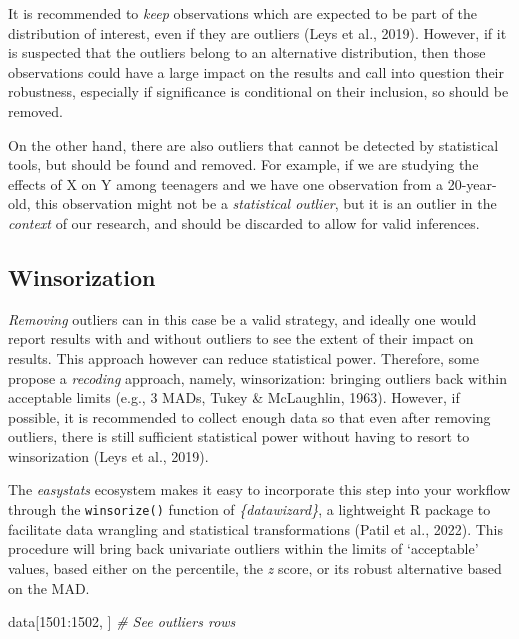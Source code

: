 \documentclass{article}
\newenvironment{Shaded}{\begin{snugshade}}{\end{snugshade}}
\newcommand{\CommentTok}[1]{\textcolor[rgb]{0.56,0.35,0.01}{\textit{#1}}}
\newcommand{\DecValTok}[1]{\textcolor[rgb]{0.00,0.00,0.81}{#1}}
\newcommand{\NormalTok}[1]{#1}
\newcommand{\SpecialCharTok}[1]{\textcolor[rgb]{0.00,0.00,0.00}{#1}}
\begin{document}
It is recommended to \emph{keep} observations which are expected to be
part of the distribution of interest, even if they are outliers (Leys et
al., 2019). However, if it is suspected that the outliers belong to an
alternative distribution, then those observations could have a large
impact on the results and call into question their robustness,
especially if significance is conditional on their inclusion, so should
be removed.

On the other hand, there are also outliers that cannot be detected by
statistical tools, but should be found and removed. For example, if we
are studying the effects of X on Y among teenagers and we have one
observation from a 20-year-old, this observation might not be a
\emph{statistical outlier}, but it is an outlier in the \emph{context}
of our research, and should be discarded to allow for valid inferences.

\hypertarget{winsorization}{%
\subsection{Winsorization}\label{winsorization}}

\emph{Removing} outliers can in this case be a valid strategy, and
ideally one would report results with and without outliers to see the
extent of their impact on results. This approach however can reduce
statistical power. Therefore, some propose a \emph{recoding} approach,
namely, winsorization: bringing outliers back within acceptable limits
(e.g., 3 MADs, Tukey \& McLaughlin, 1963). However, if possible, it is
recommended to collect enough data so that even after removing outliers,
there is still sufficient statistical power without having to resort to
winsorization (Leys et al., 2019).

The \emph{easystats} ecosystem makes it easy to incorporate this step
into your workflow through the \texttt{winsorize()} function of
\emph{\{datawizard\}}, a lightweight R package to facilitate data
wrangling and statistical transformations (Patil et al., 2022). This
procedure will bring back univariate outliers within the limits of
`acceptable' values, based either on the percentile, the \emph{z} score,
or its robust alternative based on the MAD.

\begin{Shaded}
\begin{Highlighting}[]
\NormalTok{data[}\DecValTok{1501}\SpecialCharTok{:}\DecValTok{1502}\NormalTok{, ]  }\CommentTok{\# See outliers rows}
\end{Highlighting}
\end{Shaded}
\end{document}
